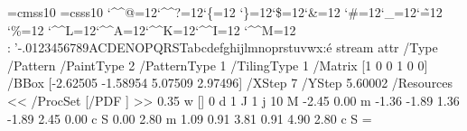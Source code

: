 \font\THFa=cmss10
\font\THFb=csss10
\begingroup
\catcode`\^^@=12\catcode`\^^?=12\catcode`\{=12
\catcode`\}=12\catcode`\$=12\catcode`\&=12
\catcode`\#=12\catcode`\_=12\catcode`\~=12
\catcode`\%=12
\catcode`\^^L=12\catcode`\^^A=12\catcode`\^^K=12\catcode`\^^I=12
\catcode`\^^M=12
\THFa:^^12'-.0123456789ACDENOPQRSTabcdefghijlmnoprstuvwx\endinclude{}\THFb:^^e9\endinclude\endgroup
\immediate\pdfobj stream attr {/Type /Pattern
/PaintType 2 /PatternType 1 /TilingType 1
/Matrix [1 0 0 1 0 0]
/BBox [-2.62505 -1.58954 5.07509 2.97496]
/XStep 7
/YStep 5.60002
/Resources << /ProcSet [/PDF ] >>} {
0.35 w
[] 0 d
1 J
1 j
10 M
-2.45 0.00 m
-1.36 -1.89 1.36 -1.89 2.45 0.00 c
S
0.00 2.80 m
1.09 0.91 3.81 0.91 4.90 2.80 c
S
}\newcount\THPa\THPa=\pdflastobj
